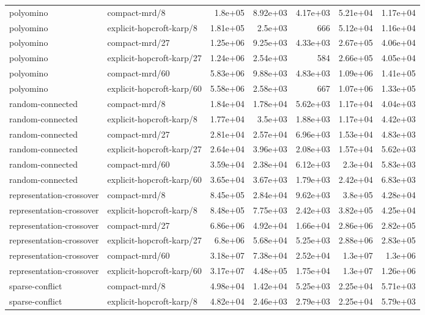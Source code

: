 \begin{table}[t]
\begin{tabular}{llrrrrr}
polyomino & compact-mrd/8 & 1.8e+05 & 8.92e+03 & 4.17e+03 & 5.21e+04 & 1.17e+04 \\
polyomino & explicit-hopcroft-karp/8 & 1.81e+05 & 2.5e+03 & 666 & 5.12e+04 & 1.16e+04 \\
polyomino & compact-mrd/27 & 1.25e+06 & 9.25e+03 & 4.33e+03 & 2.67e+05 & 4.06e+04 \\
polyomino & explicit-hopcroft-karp/27 & 1.24e+06 & 2.54e+03 & 584 & 2.66e+05 & 4.05e+04 \\
polyomino & compact-mrd/60 & 5.83e+06 & 9.88e+03 & 4.83e+03 & 1.09e+06 & 1.41e+05 \\
polyomino & explicit-hopcroft-karp/60 & 5.58e+06 & 2.58e+03 & 667 & 1.07e+06 & 1.33e+05 \\
random-connected & compact-mrd/8 & 1.84e+04 & 1.78e+04 & 5.62e+03 & 1.17e+04 & 4.04e+03 \\
random-connected & explicit-hopcroft-karp/8 & 1.77e+04 & 3.5e+03 & 1.88e+03 & 1.17e+04 & 4.42e+03 \\
random-connected & compact-mrd/27 & 2.81e+04 & 2.57e+04 & 6.96e+03 & 1.53e+04 & 4.83e+03 \\
random-connected & explicit-hopcroft-karp/27 & 2.64e+04 & 3.96e+03 & 2.08e+03 & 1.57e+04 & 5.62e+03 \\
random-connected & compact-mrd/60 & 3.59e+04 & 2.38e+04 & 6.12e+03 & 2.3e+04 & 5.83e+03 \\
random-connected & explicit-hopcroft-karp/60 & 3.65e+04 & 3.67e+03 & 1.79e+03 & 2.42e+04 & 6.83e+03 \\
representation-crossover & compact-mrd/8 & 8.45e+05 & 2.84e+04 & 9.62e+03 & 3.8e+05 & 4.28e+04 \\
representation-crossover & explicit-hopcroft-karp/8 & 8.48e+05 & 7.75e+03 & 2.42e+03 & 3.82e+05 & 4.25e+04 \\
representation-crossover & compact-mrd/27 & 6.86e+06 & 4.92e+04 & 1.66e+04 & 2.86e+06 & 2.82e+05 \\
representation-crossover & explicit-hopcroft-karp/27 & 6.8e+06 & 5.68e+04 & 5.25e+03 & 2.88e+06 & 2.83e+05 \\
representation-crossover & compact-mrd/60 & 3.18e+07 & 7.38e+04 & 2.52e+04 & 1.3e+07 & 1.3e+06 \\
representation-crossover & explicit-hopcroft-karp/60 & 3.17e+07 & 4.48e+05 & 1.75e+04 & 1.3e+07 & 1.26e+06 \\
sparse-conflict & compact-mrd/8 & 4.98e+04 & 1.42e+04 & 5.25e+03 & 2.25e+04 & 5.71e+03 \\
sparse-conflict & explicit-hopcroft-karp/8 & 4.82e+04 & 2.46e+03 & 2.79e+03 & 2.25e+04 & 5.79e+03 \\

\end{tabular}
\end{table}
